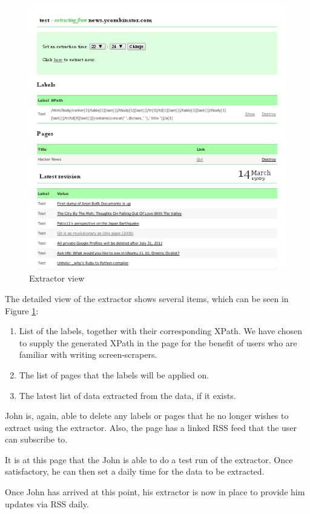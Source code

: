 \begin{figure}[htbp]
\centering
\includegraphics[scale=0.5]{extractorview.png} 
\caption{Extractor view}
\label{fig:extractorview}
\end{figure}
 The detailed view of the extractor shows several items,
  which can be seen in Figure \ref{fig:extractorview}:
 \begin{enumerate}
 	\item List of the labels, together with their corresponding XPath.
 	We have chosen to supply the generated XPath in the page for the benefit
	of users who are familiar with writing screen-scrapers.
 	\item The list of pages that the labels will be applied on.
 	\item The latest list of data extracted from the data, if it exists.
 \end{enumerate}
 John is, again, able to delete any labels or pages that he no longer wishes to extract
 using the extractor. Also, the page has a linked RSS feed that the user can subscribe to.
 
 It is at this page that the John is able to do a test run of the extractor. Once satisfactory,
 he can then set a daily time for the data to be extracted.
 
 Once John has arrived at this point, his extractor is now in place to provide him updates
 via RSS daily.
